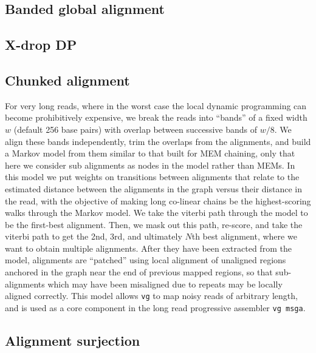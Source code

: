 \subsection{Banded global alignment}

\subsection{X-drop DP}


\subsection{Chunked alignment}

For very long reads, where in the worst case the local dynamic programming can become prohibitively expensive, we break the reads into ``bands'' of a fixed width $w$ (default 256 base pairs) with overlap between successive bands of $w/8$.
We align these bands independently, trim the overlaps from the alignments, and build a Markov model from them similar to that built for MEM chaining, 
only that here we consider sub alignments as nodes in the model rather than MEMs. 
In this model we put weights on transitions between alignments that relate to the estimated distance between the alignments in the graph versus their distance in the read, with the objective of making long co-linear chains be the highest-scoring walks through the Markov model.
We take the viterbi path through the model to be the first-best alignment.
Then, we mask out this path, re-score, and take the viterbi path to get the 2nd, 3rd, and ultimately $N$th best alignment, where we want to obtain multiple alignments. 
After they have been extracted from the model, alignments are ``patched'' using local alignment of unaligned regions anchored in the graph near the end of previous mapped regions, so that sub-alignments which may have been misaligned due to repeats may be locally aligned correctly.
This model allows {\tt vg} to map noisy reads of arbitrary length, and is used as a core component in the long read progressive assembler {\tt vg msga}.


\subsection{Alignment surjection}



